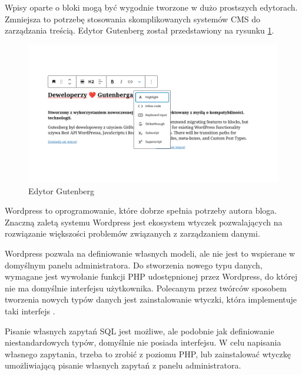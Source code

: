 Wpisy oparte o bloki mogą być wygodnie tworzone w dużo prostszych edytorach.
Zmniejsza to potrzebę stosowania skomplikowanych systemów CMS do zarządzania
treścią. Edytor Gutenberg został przedstawiony na rysunku \ref{gutenbergFigure}.

\begin{figure}[h]
    \centering
    \includegraphics[width=1\textwidth]{./img/gutenberg.png}
    \caption{Edytor Gutenberg}
    \label{gutenbergFigure}
\end{figure}

\FloatBarrier

Wordpress to oprogramowanie, które dobrze spełnia potrzeby autora
bloga. Znaczną zaletą systemu Wordpress jest ekosystem wtyczek pozwalających na
rozwiązanie większości problemów związanych z zarządzaniem danymi.

\medspace


Wordpress pozwala na definiowanie własnych modeli, ale nie jest to wspierane w
domyślnym panelu administratora. Do stworzenia nowego typu danych, wymagane jest
wywołanie funkcji PHP udostępnionej przez Wordpress, do której nie ma domyślnie
interfejsu użytkownika. Polecanym przez twórców sposobem tworzenia nowych typów
danych jest zainstalowanie wtyczki, która implementuje taki interfejs
\cite{WordpressCustomType}.

Pisanie własnych zapytań SQL jest możliwe, ale podobnie jak definiowanie
niestandardowych typów, domyślnie nie posiada interfejsu. W celu napisania
własnego zapytania, trzeba to zrobić z poziomu PHP, lub zainstalować wtyczkę
umożliwiającą pisanie własnych zapytań z panelu administratora.

